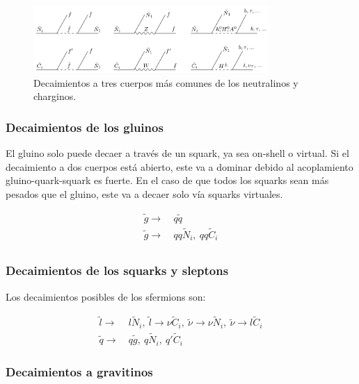 \begin{figure}
  \centering
  \includegraphics[width=0.8\textwidth]{images/nc_decays.png}
  \caption{Decaimientos a tres cuerpos más comunes de los neutralinos y charginos.}
  \label{fig:susy_three_body_decays}
\end{figure}

\subsubsection{Decaimientos de los gluinos}

El gluino solo puede decaer a través de un squark, ya sea on-shell o virtual. Si el decaimiento a
dos cuerpos está abierto, este va a dominar debido al acoplamiento gluino-quark-squark es fuerte.
En el caso de que todos los squarks sean más pesados que el gluino, este va a decaer solo vía
squarks virtuales.



\begin{equation}
	\begin{split}
		\tilde{g}\to &\ q\tilde{q} \\
		\tilde{g}\to &\ qq\tilde{N}_i,\ qq\tilde{C}_i \\
	\end{split}
\end{equation}

\subsubsection{Decaimientos de los squarks y sleptons}

Los decaimientos posibles de los sfermions son:

\begin{equation}
	\begin{split}
		\tilde{l}\to &\ l\tilde{N}_i,\ \tilde{l}\to \nu\tilde{C}_i,\ \tilde{\nu}\to \nu\tilde{N}_i,\ \tilde{\nu}\to l\tilde{C}_i \\
		\tilde{q}\to &\ q\tilde{g},\ q\tilde{N}_i,\ q'\tilde{C}_i
	\end{split}
\end{equation}

\subsubsection{Decaimientos a gravitinos}

